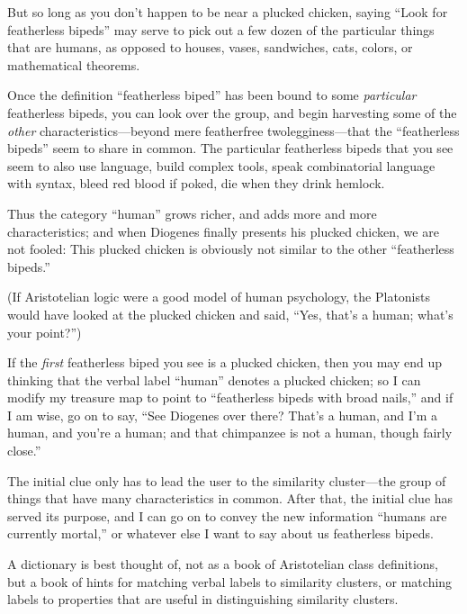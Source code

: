 {{{
 But so long as you don't happen to be near a
plucked chicken, saying ``Look for featherless
bipeds'' may serve to pick out a few dozen of the
particular things that are humans, as opposed to houses, vases,
sandwiches, cats, colors, or mathematical theorems.}

{
 Once the definition ``featherless
biped'' has been bound to some \textit{particular}
featherless bipeds, you can look over the group, and begin harvesting
some of the \textit{other} characteristics---beyond mere featherfree
twolegginess---that the ``featherless
bipeds'' seem to share in common. The particular
featherless bipeds that you see seem to also use language, build
complex tools, speak combinatorial language with syntax, bleed red
blood if poked, die when they drink hemlock.}

{
 Thus the category ``human''
grows richer, and adds more and more characteristics; and when Diogenes
finally presents his plucked chicken, we are not fooled: This plucked
chicken is obviously not similar to the other
``featherless bipeds.''}

{
 (If Aristotelian logic were a good model of human psychology, the
Platonists would have looked at the plucked chicken and said,
``Yes, that's a human;
what's your point?'')}

{
 If the \textit{first} featherless biped you see is a plucked
chicken, then you may end up thinking that the verbal label
``human'' denotes a plucked chicken;
so I can modify my treasure map to point to
``featherless bipeds with broad
nails,'' and if I am wise, go on to say,
``See Diogenes over there? That's a
human, and I'm a human, and you're a
human; and that chimpanzee is not a human, though fairly
close.''}

{
 The initial clue only has to lead the user to the similarity
cluster---the group of things that have many characteristics in common.
After that, the initial clue has served its purpose, and I can go on to
convey the new information ``humans are currently
mortal,'' or whatever else I want to say about us
featherless bipeds.}

{
 A dictionary is best thought of, not as a book of Aristotelian
class definitions, but a book of hints for matching verbal labels to
similarity clusters, or matching labels to properties that are useful
in distinguishing similarity clusters.}

\myendsectiontext


}}
